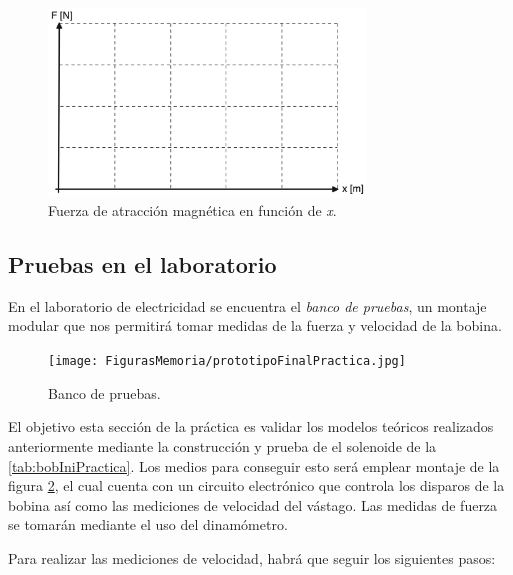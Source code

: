 \begin{figure}[H]
    \centering 
    \includegraphics[width=0.75\textwidth]{FigurasMemoria/grafFuerzaPractica.png}
    \caption{Fuerza de atracción magnética en función de \textit{x}.}
    \label{fig:grafFuerzaPractica} %
\end{figure}

\subsection*{Pruebas en el laboratorio}

En el laboratorio de electricidad se encuentra el \textit{banco de pruebas}, un montaje modular que nos permitirá tomar medidas de la fuerza y velocidad de la bobina.

\begin{figure}[H]
    \centering
    \texttt{[image: FigurasMemoria/prototipoFinalPractica.jpg]}
    \caption{Banco de pruebas.}
    \label{fig:prototipoFinalPractica} %
\end{figure}

El objetivo esta sección de la práctica es validar los modelos teóricos realizados anteriormente mediante la construcción y prueba de el solenoide de la \ref{tab:bobIniPractica}. Los medios para conseguir esto será emplear montaje de la figura \ref{fig:prototipoFinalPractica}, el cual cuenta con un circuito electrónico que controla los disparos de la bobina así como las mediciones de velocidad del vástago. Las medidas de fuerza se tomarán mediante el uso del dinamómetro.

Para realizar las mediciones de velocidad, habrá que seguir los siguientes pasos:

